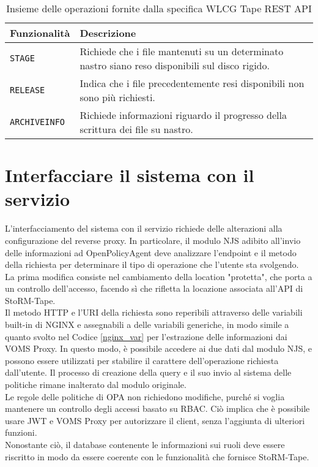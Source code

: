 \begin{table}
\begin{center}
\begin{tabular}{ | m{7em} | m{18em} | } 
  \hline
  \textbf{Funzionalità} & \textbf{Descrizione} \\ 
  \hline
  \texttt{STAGE} & Richiede che i file mantenuti su un determinato nastro siano reso disponibili sul disco rigido. \\ 
  \hline
  \texttt{RELEASE} & Indica che i file precedentemente resi disponibili non sono più richiesti. \\ 
  \hline
  \texttt{ARCHIVEINFO} & Richiede informazioni riguardo il progresso della scrittura dei file su nastro. \\ 
  \hline
\end{tabular}
\caption{\label{tab:table-name} Insieme delle operazioni fornite dalla specifica WLCG Tape REST API}
\end{center}
\end{table}

\section{Interfacciare il sistema con il servizio}
L'interfacciamento del sistema con il servizio richiede delle alterazioni alla configurazione del reverse proxy. In particolare, 
il modulo NJS adibito all'invio delle informazioni ad OpenPolicyAgent deve analizzare l'endpoint e il metodo della richiesta per 
determinare il tipo di operazione che l'utente sta svolgendo.
\\ La prima modifica consiste nel cambiamento della location "protetta", che porta a un controllo dell'accesso, 
facendo sì che rifletta la locazione associata all'API di StoRM-Tape.  
\\ Il metodo HTTP e l'URI della richiesta sono reperibili attraverso delle variabili built-in di NGINX e assegnabili 
a delle variabili generiche, in modo simile a quanto svolto
nel Codice \ref*{nginx_var} per l'estrazione delle informazioni dai VOMS Proxy. In questo modo, è possibile accedere ai due dati dal modulo NJS,
 e possono essere utilizzati per stabilire il carattere dell'operazione richiesta dall'utente. Il processo di creazione della query e il suo invio al
  sistema delle politiche rimane inalterato dal modulo originale. 
\\ Le regole delle politiche di OPA non richiedono modifiche, purché si voglia mantenere un controllo degli accessi basato su RBAC. Ciò implica che è possibile usare JWT e VOMS Proxy 
per autorizzare il client, senza l'aggiunta di ulteriori funzioni. 
\\ Nonostante ciò, il database contenente le informazioni sui ruoli deve essere riscritto in modo da essere coerente con 
le funzionalità che fornisce StoRM-Tape. 

